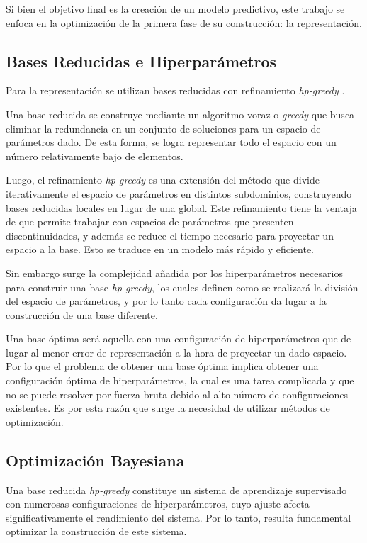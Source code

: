 Si bien el objetivo final es la creación de un modelo predictivo, este trabajo se enfoca en la optimización de la primera fase de su construcción: la representación.


\subsection*{Bases Reducidas e Hiperparámetros}

Para la representación se utilizan bases reducidas \cite{rb0book, doi:10.1137/09075250X, PhysRevLett.106.221102, 10.1115/1.1448332, rb1book} con refinamiento \textit{hp-greedy} \cite{Cerino:2022dhr}.

Una base reducida se construye mediante un algoritmo voraz o \textit{greedy} que busca eliminar la redundancia en un conjunto de soluciones para un espacio de parámetros dado. De esta forma, se logra representar todo el espacio con un número relativamente bajo de elementos. 

Luego, el refinamiento \textit{hp-greedy} es una extensión del método que divide iterativamente el espacio de parámetros en distintos subdominios, construyendo bases reducidas locales en lugar de una global. Este refinamiento tiene la ventaja de que permite trabajar con espacios de parámetros que presenten discontinuidades, y además se reduce el tiempo necesario para proyectar un espacio a la base. Esto se traduce en un modelo más rápido y eficiente.

Sin embargo surge la complejidad añadida por los hiperparámetros necesarios para construir una base \textit{hp-greedy}, los cuales definen como se realizará la división del espacio de parámetros, y por lo tanto cada configuración da lugar a la construcción de una base diferente.

Una base óptima será aquella con una configuración de hiperparámetros que de lugar al menor error de representación a la hora de proyectar un dado espacio. Por lo que el problema de obtener una base óptima implica obtener una configuración óptima de hiperparámetros, la cual es una tarea complicada y que no se puede resolver por fuerza bruta debido al alto número de configuraciones existentes. Es por esta razón que surge la necesidad de utilizar métodos de optimización.

\subsection*{Optimización Bayesiana}

Una base reducida \textit{hp-greedy} constituye un sistema de aprendizaje supervisado con numerosas configuraciones de hiperparámetros, cuyo ajuste afecta significativamente el rendimiento del sistema. Por lo tanto, resulta fundamental optimizar la construcción de este sistema.

